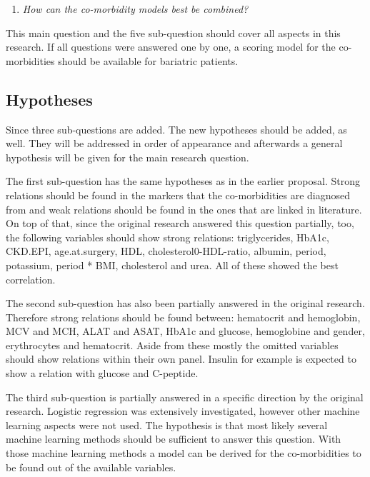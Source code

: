\documentclass[10pt,a4paper]{report}
\begin{document}
	\begin{enumerate}[resume]
		\item \emph{How can the co-morbidity models best be combined?}
	\end{enumerate}
	
	This main question and the five sub-question should cover all aspects in this research. If all questions were answered one by one, a scoring model for the co-morbidities should be available for bariatric patients.
	
	\subsection{Hypotheses}
	
	Since three sub-questions are added. The new hypotheses should be added, as well. They will be addressed in order of appearance and afterwards a general hypothesis will be given for the main research question.
	
	The first sub-question has the same hypotheses as in the earlier proposal. Strong relations should be found in the markers that the co-morbidities are diagnosed from and weak relations should be found in the ones that are linked in literature. On top of that, since the original research answered this question partially, too, the following variables should show strong relations: triglycerides, HbA1c, CKD.EPI, age.at.surgery, HDL, cholesterol0-HDL-ratio, albumin, period, potassium, period * BMI, cholesterol and urea. All of these showed the best correlation.
	
	The second sub-question has also been partially answered in the original research. Therefore strong relations should be found between: hematocrit and hemoglobin, MCV and MCH, ALAT and ASAT, HbA1c and glucose, hemoglobine and gender, erythrocytes and hematocrit. Aside from these mostly the omitted variables should show relations within their own panel. Insulin for example is expected to show a relation with glucose and C-peptide.
	
	The third sub-question is partially answered in a specific direction by the original research. Logistic regression was extensively investigated, however other machine learning aspects were not used. The hypothesis is that most likely several machine learning methods should be sufficient to answer this question. With those machine learning methods a model can be derived for the co-morbidities to be found out of the available variables.
	
\end{document}
